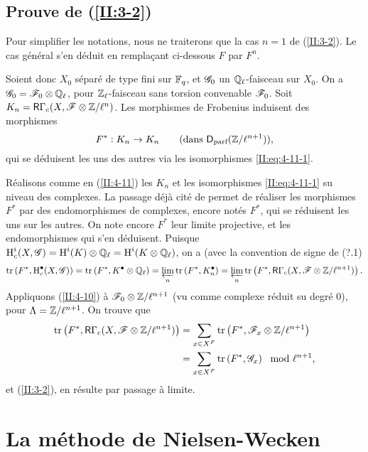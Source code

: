 \subsection{Prouve de \texorpdfstring{(\ref{II:3-2})}{(3.2)}}\label{II:4-13}

Pour simplifier les notations, nous ne traiterons que la cas $n=1$ de 
(\ref{II:3-2}). Le cas g\'en\'eral s'en d\'eduit en remplaçant ci-dessous 
$F$ par $F^n$. 

Soient donc $X_0$ s\'epar\'e de type fini sur $\mathbb{F}_q$, et $\mathscr{G}_0$ un 
$\mathbb{Q}_\ell$-faisceau sur $X_0$. On a $\mathscr{G}_0=\mathscr{F}_0\otimes\mathbb{Q}_\ell$, pour 
$\mathbb{Z}_\ell$-faisceau sans torsion convenable $\mathscr{F}_0$. Soit 
$K_n=\mathsf{R}\Gamma_c(X,\mathscr{F}\otimes\mathbb{Z}/\ell^n)$. Les morphismes de Frobenius induisent 
des morphismes 
\[
  F^* : K_n\to K_n \qquad \text{(dans $\mathsf{D}_\text{parf}(\mathbb{Z}/\ell^{n+1})$),}
\]
qui se d\'eduisent les uns des autres via les isomorphismes 
\eqref{II:eq:4-11-1}. 

R\'ealisons comme en (\ref{II:4-11}) les $K_n$ et les isomorphismes 
\eqref{II:eq:4-11-1} su niveau des complexes. La passage d\'ej\`a cit\'e de 
\cite[XV.3.3]{SGA5} permet de r\'ealiser les morphismes $F^*$ par des 
endomorphismes de complexes, encore not\'es $F^*$, qui se r\'eduisent les uns 
sur les autres. On note encore $F^*$ leur limite projective, et les 
endomorphismes qui s'en d\'eduisent. Puisque 
$\operatorname{H}_c^i(X,\mathscr{G}) = \operatorname{H}^i(K)\otimes\mathbb{Q}_\ell = \operatorname{H}^i(K\otimes\mathbb{Q}_\ell)$, on a (avec 
la convention de signe de (?.1) 
\[
  \operatorname{tr}\left(F^*, \operatorname{H}_c^\bullet(X,\mathscr{G})\right) = \operatorname{tr}\left(F^*,K^\bullet\otimes\mathbb{Q}_\ell\right) = \varprojlim_n \operatorname{tr}\left(F^*,K_n^\bullet\right) = \varprojlim_n \operatorname{tr}\left(F^*,\mathsf{R}\Gamma_c(X,\mathscr{F}\otimes\mathbb{Z}/\ell^{n+1})\right) \text{.}
\]
Appliquons (\ref{II:4-10}) \`a $\mathscr{F}_0\otimes\mathbb{Z}/\ell^{n+1}$ (vu comme complexe 
r\'eduit su degr\'e $0$), pour $\Lambda=\mathbb{Z}/\ell^{n+1}$. On trouve que 
\begin{align*}
  \operatorname{tr}\left(F^*,\mathsf{R}\Gamma_c(X,\mathscr{F}\otimes\mathbb{Z}/\ell^{n+1})\right) 
    &= \sum_{x\in X^F} \operatorname{tr}\left(F^*,\mathscr{F}_x\otimes\mathbb{Z}/\ell^{n+1}\right) \\
    &= \sum_{x\in X^F} \operatorname{tr}\left(F^*,\mathscr{G}_x\right) \mod \ell^{n+1} \text{,}
\end{align*}
et (\ref{II:3-2}), en r\'esulte par passage \`a limite. 










\section{La m\'ethode de Nielsen-Wecken}\label{II:5}

